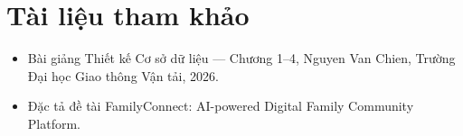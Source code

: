 \chapter*{Tài liệu tham khảo}

\begin{itemize}
  \item Bài giảng Thiết kế Cơ sở dữ liệu --- Chương 1--4, Nguyen Van Chien, Trường Đại học Giao thông Vận tải, 2026.
  \item Đặc tả đề tài FamilyConnect: AI-powered Digital Family Community Platform.
\end{itemize}

